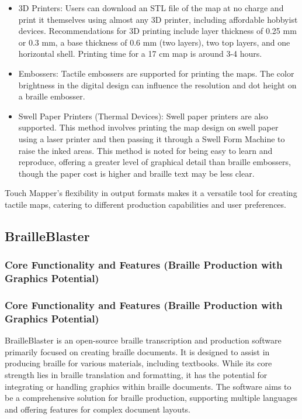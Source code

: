 \begin{itemize}
    \item 3D Printers: Users can download an STL file of the map at no charge and print it themselves using almost any 3D printer, including affordable hobbyist devices. \cite{AELData,NYUWorkflow,Ability2AccessTSS} Recommendations for 3D printing include layer thickness of 0.25 mm or 0.3 mm, a base thickness of 0.6 mm (two layers), two top layers, and one horizontal shell. \cite{AELData} Printing time for a 17 cm map is around 3-4 hours. \cite{AELData}
    \item Embossers: Tactile embossers are supported for printing the maps. \cite{NYUWorkflow} The color brightness in the digital design can influence the resolution and dot height on a braille embosser. \cite{DuxburyProducts}
    \item Swell Paper Printers (Thermal Devices): Swell paper printers are also supported. \cite{NYUWorkflow} This method involves printing the map design on swell paper using a laser printer and then passing it through a Swell Form Machine to raise the inked areas. \cite{DuxburyProducts} This method is noted for being easy to learn and reproduce, offering a greater level of graphical detail than braille embossers, though the paper cost is higher and braille text may be less clear. \cite{DuxburyProducts}
\end{itemize}

Touch Mapper's flexibility in output formats makes it a versatile tool for creating tactile maps, catering to different production capabilities and user preferences.

\subsection{BrailleBlaster}

\subsubsection{Core Functionality and Features (Braille Production with Graphics Potential)}

\subsubsection{Core Functionality and Features (Braille Production with Graphics Potential)}

BrailleBlaster is an open-source braille transcription and production software primarily focused on creating braille documents. It is designed to assist in producing braille for various materials, including textbooks. While its core strength lies in braille translation and formatting, it has the potential for integrating or handling graphics within braille documents. The software aims to be a comprehensive solution for braille production, supporting multiple languages and offering features for complex document layouts.

